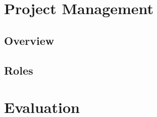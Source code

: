\documentclass[12pt]{article}
\begin{document}
\section{Project Management}
  \subsection{Overview}
  \subsection{Roles}
\section{Evaluation}
\end{document}
